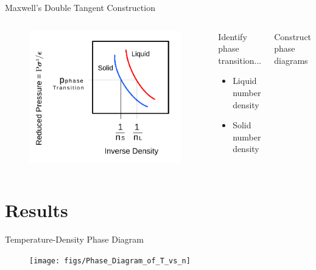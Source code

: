 \documentclass{beamer}
\begin{document}
\begin{frame}{Maxwell's Double Tangent Construction}
	\begin{columns}[t]
        \begin{figure}
            \centering
            \includegraphics[width=\columnwidth]{figs/MaxwellDTC-Fig3.pdf}
          \end{figure}
		\begin{block}{Identify phase transition...}
			\begin{itemize}
				\item Liquid number density
				\item Solid number density
			\end{itemize}
		\end{block}
		\begin{block}{Construct phase diagrams}
	    \end{block}
	\end{columns}	
\end{frame}


\section*{Results}
\begin{frame}{Temperature-Density Phase Diagram}
    \begin{figure}
        \centering
        \texttt{[image: figs/Phase\_Diagram\_of\_T\_vs\_n]}
        \label{fig:Phase_Diagram_of_T_vs_n}
    \end{figure}
\end{frame}
\end{document}
